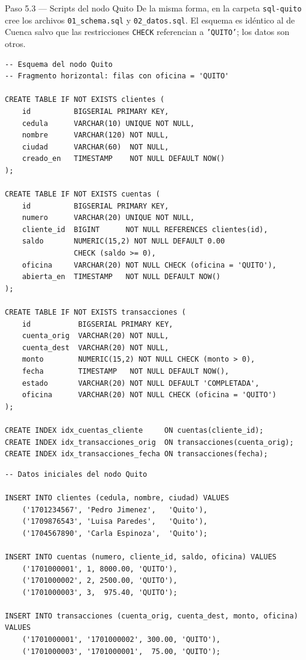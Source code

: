 \documentclass[11pt,a4paper]{article}
\begin{document}
\begin{pasobox}{Paso 5.3 --- Scripts del nodo Quito}
De la misma forma, en la carpeta \texttt{sql-quito} cree los archivos \texttt{01\_schema.sql} y \texttt{02\_datos.sql}. El esquema es id\'entico al de Cuenca salvo que las restricciones \texttt{CHECK} referencian a \texttt{'QUITO'}; los datos son otros.

\begin{lstlisting}[style=sqlstyle,caption={sql-quito/01\_schema.sql}]
-- Esquema del nodo Quito
-- Fragmento horizontal: filas con oficina = 'QUITO'

CREATE TABLE IF NOT EXISTS clientes (
    id          BIGSERIAL PRIMARY KEY,
    cedula      VARCHAR(10) UNIQUE NOT NULL,
    nombre      VARCHAR(120) NOT NULL,
    ciudad      VARCHAR(60)  NOT NULL,
    creado_en   TIMESTAMP    NOT NULL DEFAULT NOW()
);

CREATE TABLE IF NOT EXISTS cuentas (
    id          BIGSERIAL PRIMARY KEY,
    numero      VARCHAR(20) UNIQUE NOT NULL,
    cliente_id  BIGINT      NOT NULL REFERENCES clientes(id),
    saldo       NUMERIC(15,2) NOT NULL DEFAULT 0.00
                CHECK (saldo >= 0),
    oficina     VARCHAR(20) NOT NULL CHECK (oficina = 'QUITO'),
    abierta_en  TIMESTAMP   NOT NULL DEFAULT NOW()
);

CREATE TABLE IF NOT EXISTS transacciones (
    id           BIGSERIAL PRIMARY KEY,
    cuenta_orig  VARCHAR(20) NOT NULL,
    cuenta_dest  VARCHAR(20) NOT NULL,
    monto        NUMERIC(15,2) NOT NULL CHECK (monto > 0),
    fecha        TIMESTAMP   NOT NULL DEFAULT NOW(),
    estado       VARCHAR(20) NOT NULL DEFAULT 'COMPLETADA',
    oficina      VARCHAR(20) NOT NULL CHECK (oficina = 'QUITO')
);

CREATE INDEX idx_cuentas_cliente     ON cuentas(cliente_id);
CREATE INDEX idx_transacciones_orig  ON transacciones(cuenta_orig);
CREATE INDEX idx_transacciones_fecha ON transacciones(fecha);
\end{lstlisting}

\begin{lstlisting}[style=sqlstyle,caption={sql-quito/02\_datos.sql}]
-- Datos iniciales del nodo Quito

INSERT INTO clientes (cedula, nombre, ciudad) VALUES
    ('1701234567', 'Pedro Jimenez',   'Quito'),
    ('1709876543', 'Luisa Paredes',   'Quito'),
    ('1704567890', 'Carla Espinoza',  'Quito');

INSERT INTO cuentas (numero, cliente_id, saldo, oficina) VALUES
    ('1701000001', 1, 8000.00, 'QUITO'),
    ('1701000002', 2, 2500.00, 'QUITO'),
    ('1701000003', 3,  975.40, 'QUITO');

INSERT INTO transacciones (cuenta_orig, cuenta_dest, monto, oficina) VALUES
    ('1701000001', '1701000002', 300.00, 'QUITO'),
    ('1701000003', '1701000001',  75.00, 'QUITO');
\end{lstlisting}
\end{pasobox}
\end{document}
